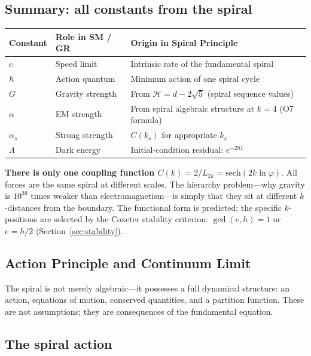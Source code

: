 \documentclass[12pt,a4paper]{article}
\begin{document}
\subsection{Summary: all constants from the spiral}

\begin{center}
\begin{tabular}{|l|l|l|}
\hline
\textbf{Constant} & \textbf{Role in SM / GR} & \textbf{Origin in Spiral Principle} \\
\hline
$c$ & Speed limit & Intrinsic rate of the fundamental spiral \\
$\hbar$ & Action quantum & Minimum action of one spiral cycle \\
$G$ & Gravity strength & From $\mathcal{H} = d - 2\sqrt{5}$ (spiral sequence values) \\
$\alpha$ & EM strength & From spiral algebraic structure at $k = 4$ (O7 formula) \\
$\alpha_s$ & Strong strength & $C(k_s)$ for appropriate $k_s$ \\
$\Lambda$ & Dark energy & Initial-condition residual: $e^{-281}$ \\
\hline
\end{tabular}
\end{center}

\textbf{There is only one coupling function $C(k) = 2/L_{2k} = \mathrm{sech}(2k\ln\varphi)$}. All forces are the same spiral at different scales. The hierarchy problem---why gravity is $10^{39}$ times weaker than electromagnetism---is simply that they sit at different $k$-distances from the boundary. The functional form is predicted; the specific $k$-positions are selected by the Coxeter stability criterion: $\gcd(e, h) = 1$ or $e = h/2$ (Section~\ref{sec:stability}).

\subsection{Action Principle and Continuum Limit}
\label{sec:action-continuum}
\label{sec:action}


The spiral is not merely algebraic---it possesses a full dynamical structure: an action, equations of motion, conserved quantities, and a partition function. These are not assumptions; they are consequences of the fundamental equation.

\subsection{The spiral action}
\label{sec:spiral-action}
\end{document}
